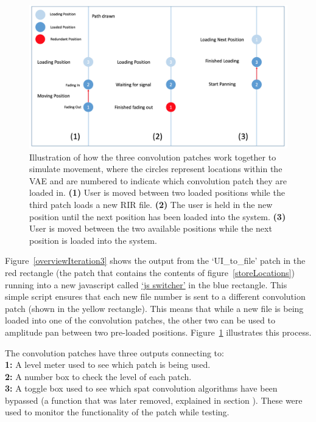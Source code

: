 \documentclass[../../main.tex]{subfiles}
\begin{document}
			\begin{figure}[H]
				\centerline{\includegraphics[width=\textwidth]{Sections/Implementation/Max/images/Max/Iteration3/movementIllustration2.png}}
				\caption{Illustration of how the three convolution patches work together to simulate movement, where the circles represent locations within the \ac{VAE} and are numbered to indicate which convolution patch they are loaded in. \textbf{(1)} User is moved between two loaded positions while the third patch loads a new \ac{RIR} file. \textbf{(2)} The user is held in the new position until the next position has been loaded into the system. \textbf{(3)} User is moved between the two available positions while the next position is loaded into the system.}
				\label{movementIllustration}
			\end{figure}

			Figure~\ref{overviewIteration3} shows the output from the `UI\_to\_file' patch in the red rectangle (the patch that contains the contents of figure~\ref{storeLocations}) running into a new javascript called \href{http://lt669.github.io/code/javascript/html/switcher.html}{`js switcher'} in the blue rectangle. This simple script ensures that each new file number is sent to a different convolution patch (shown in the yellow rectangle). This means that while a new file is being loaded into one of the convolution patches, the other two can be used to amplitude pan between two pre-loaded positions. Figure~\ref{movementIllustration} illustrates this process.

			The convolution patches have three outputs connecting to:\\
			\textbf{1:} A level meter used to see which patch is being used.\\
			\textbf{2:} A number box to check the level of each patch. \\
			\textbf{3:} A toggle box used to see which spat convolution algorithms have been bypassed (a function that was later removed, explained in section ). These were used to monitor the functionality of the patch while testing.
\end{document}
